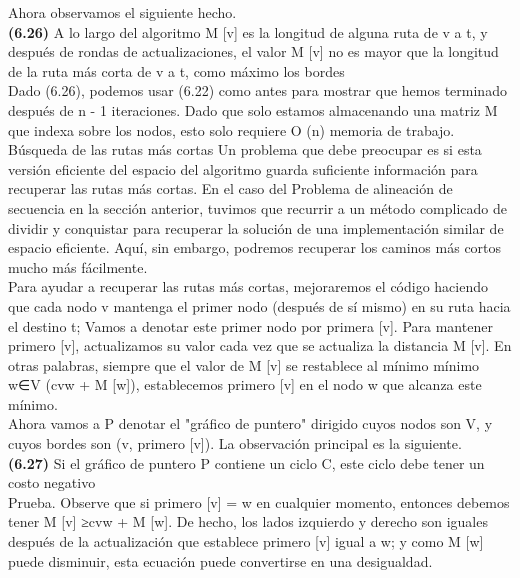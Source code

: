 \documentclass[a4paper]{article}
\begin{document}
Ahora observamos el siguiente hecho.\\

\textbf{(6.26)} A lo largo del algoritmo M [v] es la longitud de alguna ruta de v a t, y después de rondas de actualizaciones, el valor M [v] no es mayor que la longitud de la ruta más corta de v a t, como máximo los bordes\\

Dado (6.26), podemos usar (6.22) como antes para mostrar que hemos terminado después de n - 1 iteraciones. Dado que solo estamos almacenando una matriz M que indexa sobre los nodos, esto solo requiere O (n) memoria de trabajo.\\

Búsqueda de las rutas más cortas Un problema que debe preocupar es si esta versión eficiente del espacio del algoritmo guarda suficiente información para recuperar las rutas más cortas. En el caso del Problema de alineación de secuencia en la sección anterior, tuvimos que recurrir a un método complicado de dividir y conquistar para recuperar la solución de una implementación similar de espacio eficiente. Aquí, sin embargo, podremos recuperar los caminos más cortos mucho más fácilmente.\\

Para ayudar a recuperar las rutas más cortas, mejoraremos el código haciendo que cada nodo v mantenga el primer nodo (después de sí mismo) en su ruta hacia el destino t; Vamos a denotar este primer nodo por primera [v]. Para mantener primero [v], actualizamos su valor cada vez que se actualiza la distancia M [v]. En otras palabras, siempre que el valor de M [v] se restablece al mínimo mínimo w∈V (cvw + M [w]), establecemos primero [v] en el nodo w que alcanza este mínimo.\\

Ahora vamos a P denotar el "gráfico de puntero" dirigido cuyos nodos son V, y cuyos bordes son {(v, primero [v])}. La observación principal es la siguiente.\\

\textbf{(6.27)} Si el gráfico de puntero P contiene un ciclo C, este ciclo debe tener un costo negativo\\

Prueba. Observe que si primero [v] = w en cualquier momento, entonces debemos tener M [v] ≥cvw + M [w]. De hecho, los lados izquierdo y derecho son iguales después de la actualización que establece primero [v] igual a w; y como M [w] puede disminuir, esta ecuación puede convertirse en una desigualdad.\\
\end{document}
